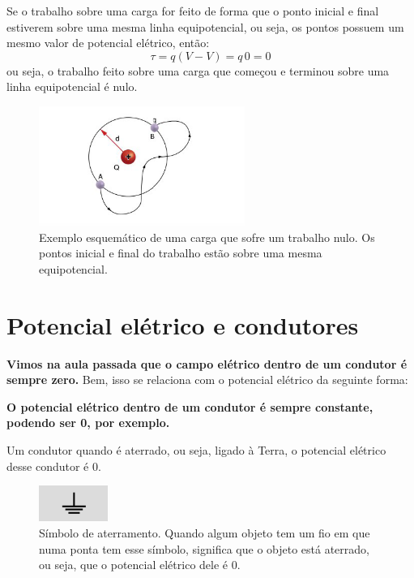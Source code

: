\documentclass[12pt]{extarticle}
\newcommand{\<}{\langle}
\renewcommand{\>}{\rangle}
\theoremstyle{definition}
\begin{document}
Se o trabalho sobre uma carga for feito de forma que o ponto inicial e final estiverem sobre uma mesma linha equipotencial, ou seja, os pontos possuem um mesmo valor de potencial elétrico, então:
\begin{equation}
    \tau=q(V-V) = q\,0 = 0
\end{equation}
\noindent ou seja, o trabalho feito sobre uma carga que começou e terminou sobre uma linha equipotencial é nulo.
\begin{figure}[H]
    \centering
    \includegraphics[width=0.6\textwidth]{equipotencial_work.png}
    \caption{Exemplo esquemático de uma carga que sofre um trabalho nulo. Os pontos inicial e final do trabalho estão sobre uma mesma equipotencial.}
    \label{fig:work_equipotential}
\end{figure}
\section{Potencial elétrico e condutores}

\textbf{Vimos na aula passada que o campo elétrico dentro de um condutor é sempre zero.} Bem, isso se relaciona com o potencial elétrico da seguinte forma:

\textbf{O potencial elétrico dentro de um condutor é sempre constante, podendo ser 0, por exemplo.}

Um condutor quando é aterrado, ou seja, ligado à Terra, o potencial elétrico desse condutor é 0.
\begin{figure}[H]
    \centering
    \includegraphics[width=0.2\textwidth]{Introducao-sobre-os-tipos-de-aterramento.png}
    \caption{Símbolo de aterramento. Quando algum objeto tem um fio em que numa ponta tem esse símbolo, significa que o objeto está aterrado, ou seja, que o potencial elétrico dele é 0.}
    \label{fig:my_label}
\end{figure}
\end{document}
